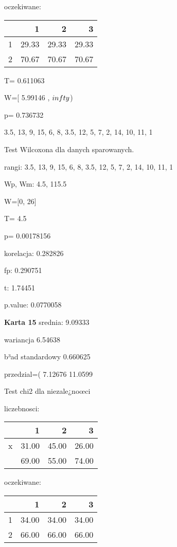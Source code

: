 \documentclass[a4paper,12pt]{article}
\begin{document}
\begin{multicols}{3}
   
   oczekiwane: %
\begin{tabular}{rrrr}
  \hline
 & 1 & 2 & 3 \\
  \hline
1 & 29.33 & 29.33 & 29.33 \\
  2 & 70.67 & 70.67 & 70.67 \\
   \hline
\end{tabular}
 
   
   T= 0.611063 
   
   W=[ 5.99146 , $\\infty$) 
   
   p= 0.736732 \vspace{1cm} 

  3.5, 13, 9, 15, 6, 8, 3.5, 12, 5, 7, 2, 14, 10, 11, 1 

  Test Wilcoxona dla danych sparowanych. 
  
  rangi: 3.5, 13, 9, 15, 6, 8, 3.5, 12, 5, 7, 2, 14, 10, 11, 1 
  
  Wp, Wm:  4.5,  115.5 
  
  W=[0, 26]  
  
  T=  4.5 
  
  p= 0.00178156 \vspace{1cm} 

  korelacja: 0.282826
     
     fp: 0.290751
     
     t: 1.74451
     
     p.value: 0.0770058 \vspace{1cm} 

  \textbf{Karta  15 } 
 srednia: 9.09333 
     
     wariancja 6.54638  
     
     b³ad standardowy 0.660625 
     
     przedzial=( 7.12676 11.0599 \vspace{1cm} 

  Test chi2 dla niezale¿noœci 
   
   liczebnosci: %
\begin{tabular}{rrrr}
  \hline
 & 1 & 2 & 3 \\
  \hline
x & 31.00 & 45.00 & 26.00 \\
   & 69.00 & 55.00 & 74.00 \\
   \hline
\end{tabular}
 
   
   oczekiwane: %
\begin{tabular}{rrrr}
  \hline
 & 1 & 2 & 3 \\
  \hline
1 & 34.00 & 34.00 & 34.00 \\
  2 & 66.00 & 66.00 & 66.00 \\
   \hline
\end{tabular}
 

\end{multicols}
\end{document}
